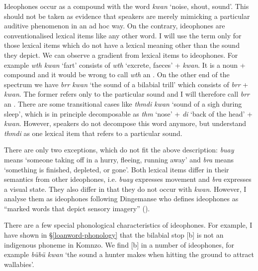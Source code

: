 Ideophones occur as a compound with the word \emph{kwan} `noise, shout, sound'. This should not be taken as evidence that speakers are merely mimicking a particular auditive phenomenon in an ad hoc way. On the contrary, ideophones are conventionalised lexical items like any other word. I will use the term  only for those lexical items which do not have a lexical meaning other than the sound they depict. We can observe a gradient from lexical items to ideophones. For example \emph{wth kwan} `fart' consists of \emph{wth} `excrete, faeces' + \emph{kwan}. It is a noun +  compound and it would be wrong to call \emph{wth} an . On the other end of the spectrum we have \emph{brr kwan} `the sound of a bilabial trill' which consists of \emph{brr} + \emph{kwan}. The former refers only to the particular sound and I will therefore call \emph{brr} an . There are some transitional cases like \emph{thmdi kwan} `sound of a sigh during sleep', which is in principle decomposable as \emph{thm} `nose' + \emph{di} `back of the head' + \emph{kwan}. However, speakers do not decompose this word anymore, but understand \emph{thmdi} as one lexical item that refers to a particular sound.

There are only two exceptions, which do not fit the above description: \emph{buay} means `someone taking off in a hurry, fleeing, running away' and \emph{bra} means `something is finished, depleted, or gone'. Both lexical items differ in their semantics from other ideophones, i.e. \emph{buay} expresses movement and \emph{bra} expresses a visual state. They also differ in that they do not occur with \emph{kwan}. However, I analyse them as ideophones following Dingemanse who defines ideophones as ``marked words that depict sensory imagery'' (\citeyear[655]{Dingemanse:2012fc}).

There are a few special phonological characteristics of ideophones. For example, I have shown in {\S}\ref{loanword-phonology} that the bilabial stop [b] is not an indigenous phoneme in Komnzo. We find [b] in a number of ideophones, for example \emph{bübü kwan} `the sound a hunter makes when hitting the ground to attract wallabies'.

